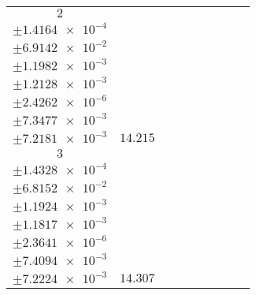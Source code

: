 \documentclass[8pt]{article}
\begin{document}
\begin{longtable}[l]{c c c c c c c c c}
$\num{2}$ & \begin{tabular}[c]{@{}c@{}}$\num{0.12171}$ \\ $\pm\num{1.4164e-4}$\end{tabular} & \begin{tabular}[c]{@{}c@{}}$\num{0.1033}$ \\ $\pm\num{6.9142e-2}$\end{tabular} & \begin{tabular}[c]{@{}c@{}}$\num{-2.2938}$ \\ $\pm\num{1.1982e-3}$\end{tabular} & \begin{tabular}[c]{@{}c@{}}$\num{942.31}$ \\ $\pm\num{1.2128e-3}$\end{tabular} & \begin{tabular}[c]{@{}c@{}}$\num{1.8851}$ \\ $\pm\num{2.4262e-6}$\end{tabular} & \begin{tabular}[c]{@{}c@{}}$\num{5.9199}$ \\ $\pm\num{7.3477e-3}$\end{tabular} & \begin{tabular}[c]{@{}c@{}}$\num{5.9098}$ \\ $\pm\num{7.2181e-3}$\end{tabular} & $\num{14.215}$\\
$\num{3}$ & \begin{tabular}[c]{@{}c@{}}$\num{0.12265}$ \\ $\pm\num{1.4328e-4}$\end{tabular} & \begin{tabular}[c]{@{}c@{}}$\num{0.5451}$ \\ $\pm\num{6.8152e-2}$\end{tabular} & \begin{tabular}[c]{@{}c@{}}$\num{2.281}$ \\ $\pm\num{1.1924e-3}$\end{tabular} & \begin{tabular}[c]{@{}c@{}}$\num{946.87}$ \\ $\pm\num{1.1817e-3}$\end{tabular} & \begin{tabular}[c]{@{}c@{}}$\num{1.8943}$ \\ $\pm\num{2.3641e-6}$\end{tabular} & \begin{tabular}[c]{@{}c@{}}$\num{5.9682}$ \\ $\pm\num{7.4094e-3}$\end{tabular} & \begin{tabular}[c]{@{}c@{}}$\num{5.8742}$ \\ $\pm\num{7.2224e-3}$\end{tabular} & $\num{14.307}$\\

\end{longtable}
\end{document}
